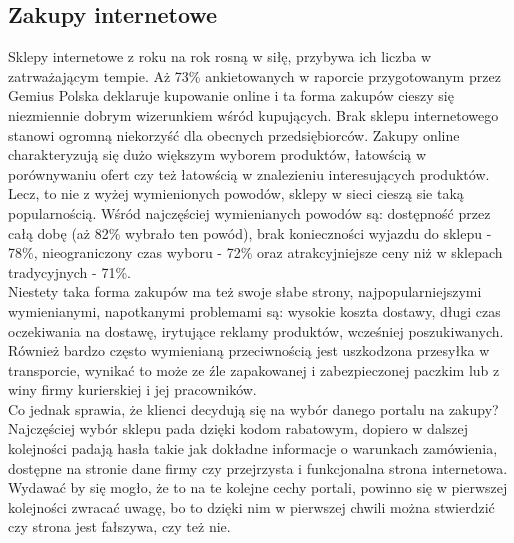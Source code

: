 \documentclass[12pt]{article}
\begin{document}
\begin{sloppypar}
{\subsection{Zakupy internetowe}
{
  Sklepy internetowe z roku na rok rosną w siłę, przybywa ich liczba w zatrważającym tempie. 
  Aż 73\% ankietowanych w raporcie przygotowanym przez Gemius Polska\cite{gemius-report} deklaruje kupowanie online i ta forma zakupów cieszy się niezmiennie dobrym 
  wizerunkiem wśród kupujących. Brak sklepu internetowego stanowi ogromną niekorzyść dla obecnych przedsiębiorców. 
  Zakupy online charakteryzują się dużo większym wyborem produktów, łatowścią w porównywaniu ofert czy też łatowścią w znalezieniu interesujących produktów. 
  Lecz, to nie z wyżej wymienionych powodów, sklepy w sieci cieszą sie taką popularnością.
  Wśród najczęściej wymienianych powodów są: dostępność przez całą dobę (aż 82\% wybrało ten powód), brak konieczności wyjazdu do sklepu - 78\%, 
  nieograniczony czas wyboru - 72\% oraz atrakcyjniejsze ceny niż w sklepach tradycyjnych - 71\%.\\
  Niestety taka forma zakupów ma też swoje słabe strony, najpopularniejszymi
  wymienianymi, napotkanymi problemami są: wysokie koszta dostawy, długi czas oczekiwania na dostawę, irytujące reklamy produktów, wcześniej poszukiwanych.
  Również bardzo często wymienianą przeciwnością jest uszkodzona przesyłka w transporcie, wynikać to może ze źle zapakowanej i zabezpieczonej paczkim lub z winy 
  firmy kurierskiej i jej pracowników.\\
  Co jednak sprawia, że klienci decydują się na wybór danego portalu na zakupy?\\
  Najczęściej wybór sklepu pada dzięki kodom rabatowym, dopiero w dalszej kolejności padają hasła takie jak dokładne informacje o warunkach zamówienia,
  dostępne na stronie dane firmy czy przejrzysta i funkcjonalna strona internetowa. Wydawać by się mogło, że to na te kolejne cechy portali, powinno się w pierwszej kolejności
  zwracać uwagę, bo to dzięki nim w pierwszej chwili można stwierdzić czy strona jest fałszywa, czy też nie.
}
}
\end{sloppypar}
\end{document}
